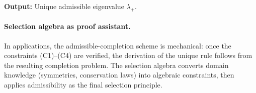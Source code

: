 \smallskip\noindent
\textbf{Output:} Unique admissible eigenvalue $\lambda_+$.

\paragraph{Selection algebra as proof assistant.}
In applications, the admissible-completion scheme is mechanical: once the
constraints (C1)--(C4) are verified, the derivation of the unique rule follows
from the resulting completion problem.
The selection algebra converts domain knowledge (symmetries, conservation laws)
into algebraic constraints, then applies admissibility as the final selection
principle.
